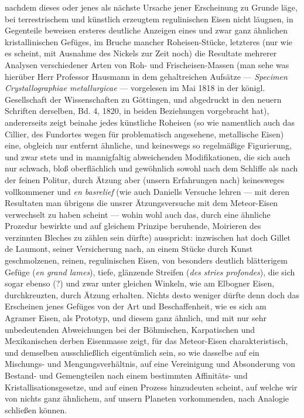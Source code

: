 \documentclass[a4paper, 11pt, oneside, german]{article}
\begin{document}
nachdem dieses oder jenes als nächste Ursache jener Erscheinung zu Grunde läge, bei terrestrischem und künstlich erzeugtem regulinischen Eisen nicht läugnen, in Gegenteile beweisen ersteres deutliche Anzeigen eines und zwar ganz ähnlichen kristallinischen Gefüges, im Bruche mancher Roheisen-Stücke, letzteres (nur wie es scheint, mit Ausnahme des Nickels zur Zeit noch) die Resultate mehrerer Analysen verschiedener Arten von Roh- und Frischeisen-Massen (man sehe was hierüber Herr Professor Hausmann in dem gehaltreichen Aufsätze --- \emph{Specimen Crystallographiae metallurgicae} --- vorgelesen im Mai 1818 in der königl. Gesellschaft der Wissenschaften zu Göttingen, und abgedruckt in den neuern Schriften derselben, Bd. 4, 1820, in beiden Beziehungen vorgebracht hat), andererseits zeigt beinahe jedes künstliche Roheisen (so wie namentlich auch das Cillier, des Fundortes wegen für problematisch angesehene, metallische Eisen) eine, obgleich nur entfernt ähnliche, und keineswegs so regelmäßige Figurierung, und zwar stets und in mannigfaltig abweichenden Modifikationen, die sich auch nur schwach, bloß oberflächlich und gewöhnlich sowohl nach dem Schliffe als nach der feinen Politur, durch Ätzung aber (unsern Erfahrungen nach) keinesweges vollkommener und \emph{en basrelief} (wie auch Daniells Versuche lehren --- mit deren Resultaten man übrigens die unsrer Ätzungsversuche mit dem Meteor-Eisen verwechselt zu haben scheint --- wohin wohl auch das, durch eine ähnliche Prozedur bewirkte und auf gleichem Prinzipe beruhende, Moirieren des verzinnten Bleches zu zählen sein dürfte) ausspricht: inzwischen hat doch Gillet de Laumont, seiner Versicherung nach, an einem Stücke durch Kunst geschmolzenen, reinen, regulinischen Eisen, von besonders deutlich blätterigem Gefüge (\emph{en grand lames}), tiefe, glänzende Streifen (\emph{des stries profondes}), die sich sogar ebenso (?) und zwar unter gleichen Winkeln, wie am Elbogner Eisen, durchkreuzten, durch Ätzung erhalten.  
Nichts desto weniger dürfte denn doch das Erscheinen jenes Gefüges von der Art und Beschaffenheit, wie es sich am Agramer Eisen, als Prototyp, und diesem ganz ähnlich, und mit nur sehr unbedeutenden Abweichungen bei der Böhmischen, Karpatischen und Mexikanischen derben Eisenmasse zeigt, für das Meteor-Eisen charakteristisch, und demselben ausschließlich eigentümlich sein, so wie dasselbe auf ein Mischungs- und Mengungsverhältnis, auf eine Vereinigung und Absonderung von Bestand- und Gemengteilen nach einem bestimmten Affinitäts- und Kristallisationsgesetze, und auf einen Prozess hinzudeuten scheint, auf welche wir von nichts ganz ähnlichem, auf unsern Planeten vorkommenden, nach Analogie schließen können.
\end{document}
